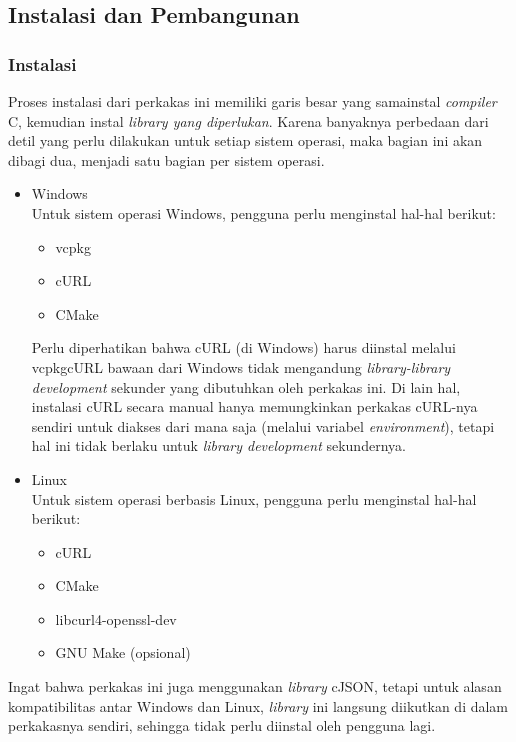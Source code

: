 \subsection{Instalasi dan Pembangunan}
\label{sec:testing-implementation-usage}

\subsubsection{Instalasi}
\label{sec:testing-implementation-usage-instalation}

Proses instalasi dari perkakas ini memiliki garis besar yang sama\textemdash instal \textit{compiler} C, kemudian instal \textit{library yang diperlukan}. Karena banyaknya perbedaan dari detil yang perlu dilakukan untuk setiap sistem operasi, maka bagian ini akan dibagi dua, menjadi satu bagian per sistem operasi.

\begin{itemize}
	\item Windows \\
	Untuk sistem operasi Windows, pengguna perlu menginstal hal-hal berikut:
	
	\begin{itemize}
		\item vcpkg
		\item cURL
		\item CMake
	\end{itemize}
	
	Perlu diperhatikan bahwa cURL (di Windows) harus diinstal melalui vcpkg\textemdash cURL bawaan dari Windows tidak mengandung \textit{library-library development} sekunder yang dibutuhkan oleh perkakas ini. Di lain hal, instalasi cURL secara manual hanya memungkinkan perkakas cURL-nya sendiri untuk diakses dari mana saja (melalui variabel \textit{environment}), tetapi hal ini tidak berlaku untuk \textit{library development} sekundernya.
	
	\item Linux \\
	Untuk sistem operasi berbasis Linux, pengguna perlu menginstal hal-hal berikut:
	
	\begin{itemize}
		\item cURL
		\item CMake
		\item libcurl4-openssl-dev
		\item GNU Make (opsional)
	\end{itemize}
	
\end{itemize}
\noindent
Ingat bahwa perkakas ini juga menggunakan \textit{library} cJSON, tetapi untuk alasan kompatibilitas antar Windows dan Linux, \textit{library} ini langsung diikutkan di dalam perkakasnya sendiri, sehingga tidak perlu diinstal oleh pengguna lagi.

